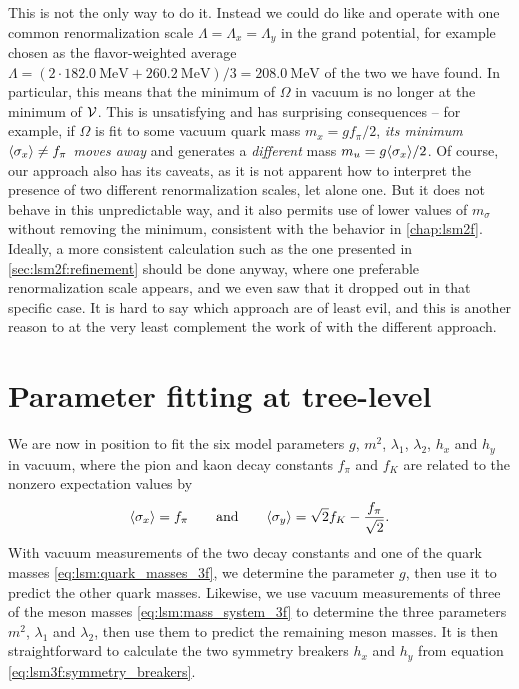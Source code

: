 This is not the only way to do it.
Instead we could do like \cite{ref:master_berge} and operate with one common renormalization scale $\Lambda = \Lambda_x = \Lambda_y$ in the grand potential,
for example chosen as the flavor-weighted average $\Lambda = (2 \cdot \SI{182.0}{\mega\electronvolt} + \SI{260.2}{\mega\electronvolt}) / 3 = \SI{208.0}{\mega\electronvolt}$ of the two we have found.
In particular, this means that the minimum of $\Omega$ in vacuum is no longer at the minimum of $\mathcal{V}$.
This is unsatisfying and has surprising consequences --
for example, if $\Omega$ is fit to some vacuum quark mass $m_x = g f_\pi/2$,
\emph{its minimum $\langle \sigma_x \rangle \neq f_\pi$ moves away} and generates a \emph{different} mass $m_u = g \langle \sigma_x \rangle / 2$.
Of course, our approach also has its caveats, as it is not apparent how to interpret the presence of two different renormalization scales, let alone one.
But it does not behave in this unpredictable way, and it also permits use of lower values of $m_\sigma$ without removing the minimum,
consistent with the behavior in \cref{chap:lsm2f}.
Ideally, a more consistent calculation such as the one presented in \cref{sec:lsm2f:refinement} should be done anyway,
where one preferable renormalization scale appears, and we even saw that it dropped out in that specific case.
It is hard to say which approach are of least evil,
and this is another reason to at the very least complement the work of \cite{ref:master_berge} with the different approach.

\section{Parameter fitting at tree-level}
\label{sec:lsm3f:parameter_fit}

We are now in position to fit the six model parameters $g$, $m^2$, $\lambda_1$, $\lambda_2$, $h_x$ and $h_y$ in vacuum,
where the pion and kaon decay constants $f_\pi$ and $f_K$ are related to the nonzero expectation values by
\cite{ref:lsm3f_details}
\begin{equation}
	\langle \sigma_x \rangle = f_\pi
	\qquad \text{and} \qquad
	\langle \sigma_y \rangle = \sqrt{2} f_K - \frac{f_\pi}{\sqrt{2}}.
\label{eq:lsm3f:decay_constants}
\end{equation}
With vacuum measurements of the two decay constants and one of the quark masses \eqref{eq:lsm:quark_masses_3f},
we determine the parameter $g$, then use it to predict the other quark masses.
Likewise, we use vacuum measurements of three of the meson masses \eqref{eq:lsm:mass_system_3f} to determine the three parameters $m^2$, $\lambda_1$ and $\lambda_2$,
then use them to predict the remaining meson masses.
It is then straightforward to calculate the two symmetry breakers $h_x$ and $h_y$ from equation \eqref{eq:lsm3f:symmetry_breakers}.

